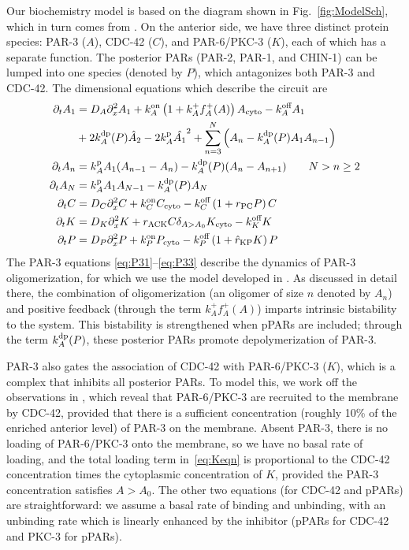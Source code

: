 \documentclass[11pt]{article}
\newcommand{\6}[1]{#1_{\text{6}}}
\newcommand{\3}[1]{#1_{\text{3}}}
\begin{document}
Our biochemistry model is based on the diagram shown in Fig.\ \ref{fig:ModelSch}, which in turn comes from \cite[Fig.~2]{lang2017proteins}. On the anterior side, we have three distinct protein species: PAR-3 ($A$), CDC-42 ($C$), and PAR-6/PKC-3 ($K$), each of which has a separate function. The posterior PARs (PAR-2, PAR-1, and CHIN-1) can be lumped into one species (denoted by $P$), which antagonizes both PAR-3 and CDC-42. The dimensional equations which describe the circuit are 
\begin{subequations}
\label{eq:AllBC}
\begin{align}
\label{eq:P31}
\partial_t A_1 & = D_A \partial_x^2 A_1 +k^\text{on}_A \left(1+k^+_A f^+_A(A) \right)A_\text{cyto}- k^\text{off}_A A_1  \\  \nonumber
 &+ 2 k^\text{dp}_A(P) \hat{A}_2-2k^\text{p}_A \hat{A_1}^2+\sum_{n=3}^N \left(A_n-k^\text{dp}_A(P) A_1 A_{n-1}\right)  \\ 
\partial_t A_n & =k^\text{p}_{A}A_1 (A_{n-1}-A_n) -k^\text{dp}_A(P)(A_n-A_{n+1})  \qquad N > n \geq 2 \\ 
\label{eq:P33}
\partial_t A_N & =k^\text{p}_A A_1  A_{N-1}-k^\text{dp}_A(P) A_N \\
\label{eq:Ceqn}
\partial_t C& =D_C \partial_x^2 {C} +k^\text{on}_C C_\text{cyto}  - k^\text{off}_C \left(1+r_\text{PC}P\right)C\\
\label{eq:Keqn}
\partial_t {K}  &= D_K \partial_x^2 {K} + {r}_\text{ACK} {C} \delta_{A > A_0}K_\text{cyto}-k^\text{off}_K K \\
\partial_t {P} & =D_P \partial_x^2 {P} +k^\text{on}_P P_\text{cyto}  - k^\text{off}_P \left(1+\hat{r}_\text{KP}{K}\right){P}
\end{align}
\end{subequations}
The PAR-3 equations \eqref{eq:P31}--\eqref{eq:P33} describe the dynamics of PAR-3 oligomerization, for which we use the model developed in \cite{lang2023oligomerization}. As discussed in detail there, the combination of oligomerization (an oligomer of size $n$ denoted by $A_n$) and positive feedback (through the term $k^+_A f^+_A(A)$) imparts intrinsic bistability to the system. This bistability is strengthened when pPARs are included; through the term $k^\text{dp}_A(P)$, these posterior PARs promote depolymerization of PAR-3.

PAR-3 also gates the association of CDC-42 with PAR-6/PKC-3 ($K$), which is a complex that inhibits all posterior PARs. To model this, we work off the observations in \cite{sailer2015dynamic}, which reveal that PAR-6/PKC-3 are recruited to the membrane by CDC-42, provided that there is a sufficient concentration (roughly 10\% of the enriched anterior level) of PAR-3 on the membrane. Absent PAR-3, there is no loading of PAR-6/PKC-3 onto the membrane, so we have no basal rate of loading, and the total loading term in\ \eqref{eq:Keqn} is proportional to the CDC-42 concentration times the cytoplasmic concentration of $K$, provided the PAR-3 concentration satisfies $A > A_0$. The other two equations (for CDC-42 and pPARs) are straightforward: we assume a basal rate of binding and unbinding, with an unbinding rate which is linearly enhanced by the inhibitor (pPARs for CDC-42 and PKC-3 for pPARs). 
\end{document}
